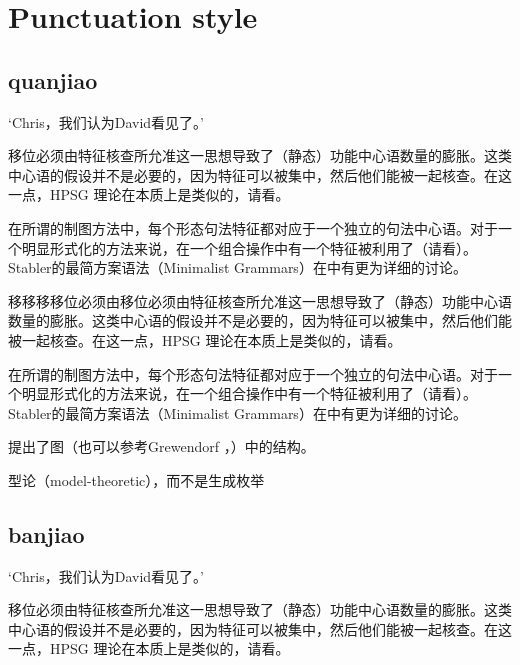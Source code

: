 \documentclass{scrbook}
\let\citew\citealp
\newcommand{\page}{}
\begin{document}
\chapter{Punctuation style}

\section{quanjiao}


    `Chris，我们认为David看见了。'

移位必须由特征核查所允准这一思想导致了（静态）功能中心语数量的膨胀。这类中心语的假设并不是必要的，因为特征可以被集中，然后他们能被一起核查。在这一点，HPSG 理论在本质上是类似的，请看\citew[\S~II.3.3.4, \S~II.4.2]{Sternefeld2006a-u}。

在所谓的制图方法中，每个形态句法特征都对应于一个独立的句法中心语\citep[\page 54, 61]{CR2010a}。对于一个明显形式化的方法来说，在一个组合操作中有一个特征被利用了（请看\citew[\page 335]{Stabler2001a}）。Stabler的最简方案语法（Minimalist Grammars）在中有更为详细的讨论。

移移移移位必须由移位必须由特征核查所允准这一思想导致了（静态）功能中心语数量的膨胀。这类中心语的假设并不是必要的，因为特征可以被集中，然后他们能被一起核查。在这一点，HPSG 理论在本质上是类似的，请看\citew[\S~II.3.3.4, \S~II.4.2]{Sternefeld2006a-u}。

在所谓的制图方法中，每个形态句法特征都对应于一个独立的句法中心语\citep[\page 54, 61]{CR2010a}。对于一个明显形式化的方法来说，在一个组合操作中有一个特征被利用了（请看\citew[\page 335]{Stabler2001a}）。Stabler的最简方案语法（Minimalist Grammars）在中有更为详细的讨论。

\citet[\page 297]{Rizzi97a-u}提出了图（也可以参考Grewendorf \citeyear[\page 85, 240]{Grewendorf2002a}，\citeyear{Grewendorf2009a}）中的结构。

型论（model-theoretic），而不是生成枚举


\section{banjiao}



    `Chris，我们认为David看见了。'

移位必须由特征核查所允准这一思想导致了（静态）功能中心语数量的膨胀。这类中心语的假设并不是必要的，因为特征可以被集中，然后他们能被一起核查。在这一点，HPSG 理论在本质上是类似的，请看\citew[\S~II.3.3.4, \S~II.4.2]{Sternefeld2006a-u}。
\end{document}
